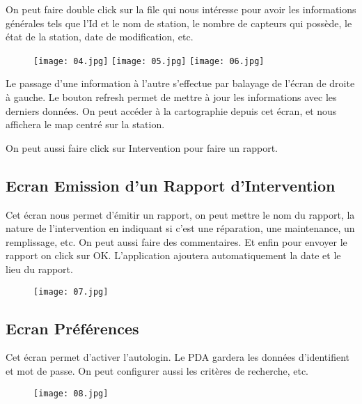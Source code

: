 \documentclass [a4paper] {report}
\begin{document}
On peut faire double click sur la file qui nous intéresse pour avoir les informations générales tels que l'Id et le nom de station, le nombre de capteurs qui possède, le état de la station, date de modification, etc.

\begin{figure}[!htbp]
\begin{center}
\texttt{[image: 04.jpg]}              
\texttt{[image: 05.jpg]}              
\texttt{[image: 06.jpg]}              
\end{center}
\end{figure} 
Le passage d'une information à l'autre s'effectue par balayage de l'écran de droite à gauche. 
Le bouton refresh permet de mettre à jour les informations avec les derniers données.
On peut accéder à la cartographie depuis cet écran, et nous affichera le map centré sur la station.

On peut aussi faire click sur Intervention pour faire un rapport.\newpage

\subsection{Ecran Emission d'un Rapport d'Intervention}
Cet écran nous permet d'émitir un rapport, on peut mettre le nom du rapport, la nature de l'intervention en indiquant si c'est une réparation, une maintenance, un remplissage, etc. 
On peut aussi faire des commentaires. Et enfin pour envoyer le rapport on click sur OK. L'application ajoutera automatiquement la date et le lieu du rapport.

\begin{figure}[!h] 
\begin{center}
\texttt{[image: 07.jpg]}
\end{center}
\end{figure}

\subsection{Ecran Préférences}
Cet écran permet d'activer l'autologin. Le PDA gardera les données d'identifient et mot de passe.
On peut configurer aussi les critères de recherche, etc.
\begin{figure}[!h] 
\begin{center}
\texttt{[image: 08.jpg]}
\end{center}
\end{figure}
\end{document}
